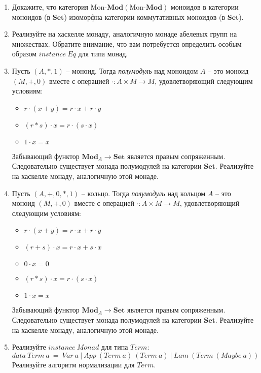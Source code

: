 \documentclass[draft]{article}
\newcommand{\cat}[1]{\mathbf{#1}}
\newcommand{\Set}{\cat{Set}}
\newcommand{\fs}[1]{\mathrm{#1}}
\newcommand{\Mod}[1]{#1\text{-}\cat{Mod}}
\begin{document}
\begin{enumerate}
\item Докажите, что категория $\Mod{\fs{Mon}}(\Mod{\fs{Mon}})$ моноидов в категории моноидов (в $\Set$) изоморфна категории коммутативных моноидов (в $\Set$).

\item Реализуйте на хаскелле монаду, аналогичную монаде абелевых групп на множествах.
Обратите внимание, что вам потребуется определить особым образом $\mathit{instance}\ \mathit{Eq}$ для типа монад.

\item Пусть $(A,*,1)$ -- моноид.
Тогда \emph{полумодуль} над моноидом $A$ -- это моноид $(M,+,0)$ вместе с операцией $\cdot : A \times M \to M$, удовлетворяющий следующим условиям:
\begin{itemize}
\item $r \cdot (x + y) = r \cdot x + r \cdot y$
\item $(r * s) \cdot x = r \cdot (s \cdot x)$
\item $1 \cdot x = x$
\end{itemize}
Забывающий функтор $\cat{Mod}_A \to \Set$ является правым сопряженным.
Следовательно существует монада полумодулей на категории $\Set$.
Реализуйте на хаскелле монаду, аналогичную этой монаде.

\item Пусть $(A,+,0,*,1)$ -- кольцо.
Тогда \emph{полумодуль} над кольцом $A$ -- это моноид $(M,+,0)$ вместе с операцией $\cdot : A \times M \to M$, удовлетворяющий следующим условиям:
\begin{itemize}
\item $r \cdot (x + y) = r \cdot x + r \cdot y$
\item $(r + s) \cdot x = r \cdot x + s \cdot x$
\item $0 \cdot x = 0$
\item $(r * s) \cdot x = r \cdot (s \cdot x)$
\item $1 \cdot x = x$
\end{itemize}
Забывающий функтор $\cat{Mod}_A \to \Set$ является правым сопряженным.
Следовательно существует монада полумодулей на категории $\Set$.
Реализуйте на хаскелле монаду, аналогичную этой монаде.

\item Реализуйте $\mathit{instance}\ \mathit{Monad}$ для типа $\mathit{Term}$:
\[ \mathit{data}\ \mathit{Term}\ a\ =\ \mathit{Var}\ a\ |\ \mathit{App}\ (\mathit{Term}\ a)\ (\mathit{Term}\ a)\ |\ \mathit{Lam}\ (\mathit{Term}\ (\mathit{Maybe}\ a)) \]
Реализуйте алгоритм нормализации для $\mathit{Term}$.

\end{enumerate}
\end{document}
